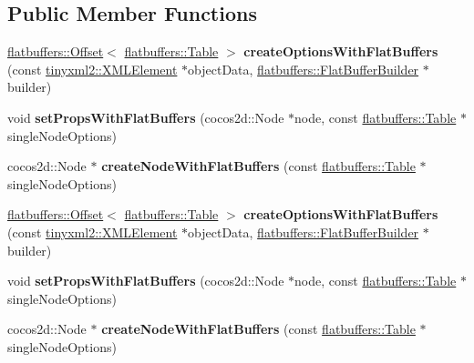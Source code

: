 \subsection*{Public Member Functions}
\begin{DoxyCompactItemize}
\item 
\mbox{\label{classcocostudio_1_1SingleNodeReader_a0b0be7addf609051717a6ef87df15080}} 
\hyperlink{structflatbuffers_1_1Offset}{flatbuffers\+::\+Offset}$<$ \hyperlink{classflatbuffers_1_1Table}{flatbuffers\+::\+Table} $>$ {\bfseries create\+Options\+With\+Flat\+Buffers} (const \hyperlink{classtinyxml2_1_1XMLElement}{tinyxml2\+::\+X\+M\+L\+Element} $\ast$object\+Data, \hyperlink{classflatbuffers_1_1FlatBufferBuilder}{flatbuffers\+::\+Flat\+Buffer\+Builder} $\ast$builder)
\item 
\mbox{\label{classcocostudio_1_1SingleNodeReader_af2e532122adb8aa98e73ca8cb0e277f2}} 
void {\bfseries set\+Props\+With\+Flat\+Buffers} (cocos2d\+::\+Node $\ast$node, const \hyperlink{classflatbuffers_1_1Table}{flatbuffers\+::\+Table} $\ast$single\+Node\+Options)
\item 
\mbox{\label{classcocostudio_1_1SingleNodeReader_a9b91bb44a4f0c796b4ea22f6b71f7a4c}} 
cocos2d\+::\+Node $\ast$ {\bfseries create\+Node\+With\+Flat\+Buffers} (const \hyperlink{classflatbuffers_1_1Table}{flatbuffers\+::\+Table} $\ast$single\+Node\+Options)
\item 
\mbox{\label{classcocostudio_1_1SingleNodeReader_a05681589040f637ca13394f1da275d5c}} 
\hyperlink{structflatbuffers_1_1Offset}{flatbuffers\+::\+Offset}$<$ \hyperlink{classflatbuffers_1_1Table}{flatbuffers\+::\+Table} $>$ {\bfseries create\+Options\+With\+Flat\+Buffers} (const \hyperlink{classtinyxml2_1_1XMLElement}{tinyxml2\+::\+X\+M\+L\+Element} $\ast$object\+Data, \hyperlink{classflatbuffers_1_1FlatBufferBuilder}{flatbuffers\+::\+Flat\+Buffer\+Builder} $\ast$builder)
\item 
\mbox{\label{classcocostudio_1_1SingleNodeReader_af2e532122adb8aa98e73ca8cb0e277f2}} 
void {\bfseries set\+Props\+With\+Flat\+Buffers} (cocos2d\+::\+Node $\ast$node, const \hyperlink{classflatbuffers_1_1Table}{flatbuffers\+::\+Table} $\ast$single\+Node\+Options)
\item 
\mbox{\label{classcocostudio_1_1SingleNodeReader_acc04ac7bd8502b5517363d326b9fa200}} 
cocos2d\+::\+Node $\ast$ {\bfseries create\+Node\+With\+Flat\+Buffers} (const \hyperlink{classflatbuffers_1_1Table}{flatbuffers\+::\+Table} $\ast$single\+Node\+Options)
\end{DoxyCompactItemize}
